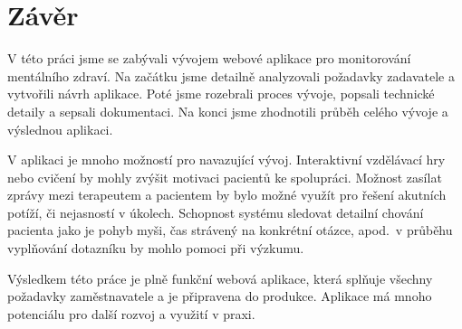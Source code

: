 \chapter*{Závěr}\label{ch:zaver}

V této práci jsme se zabývali vývojem webové aplikace pro monitorování mentálního zdraví.
Na začátku jsme detailně analyzovali požadavky zadavatele a vytvořili návrh aplikace.
Poté jsme rozebrali proces vývoje, popsali technické detaily a sepsali dokumentaci.
Na konci jsme zhodnotili průběh celého vývoje a výslednou aplikaci.

V aplikaci je mnoho možností pro navazující vývoj.
Interaktivní vzdělávací hry nebo cvičení by mohly zvýšit motivaci pacientů ke spolupráci.
Možnost zasílat zprávy mezi terapeutem a pacientem by bylo možné využít pro řešení akutních potíží, či nejasností v úkolech.
Schopnost systému sledovat detailní chování pacienta jako je pohyb myši, čas strávený na konkrétní otázce, apod.\ v průběhu vyplňování dotazníku by mohlo pomoci při výzkumu.

Výsledkem této práce je plně funkční webová aplikace, která splňuje všechny požadavky zaměstnavatele a je připravena do produkce.
Aplikace má mnoho potenciálu pro další rozvoj a využití v praxi.